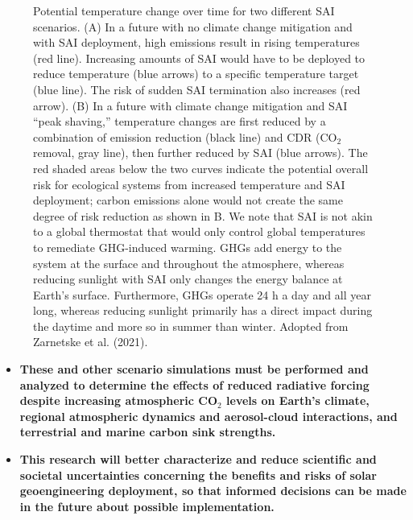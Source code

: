\begin{figure}
	\caption{Potential temperature change over time for two different SAI scenarios. (A) In a future with no climate change mitigation and with SAI deployment, high emissions result in rising temperatures (red line). Increasing amounts of SAI would have to be deployed to reduce temperature (blue arrows) to a specific temperature target (blue line). The risk of sudden SAI termination also increases (red arrow). (B) In a future with climate change mitigation and SAI ``peak shaving,'' temperature changes are first reduced by a combination of emission reduction (black line) and CDR (CO$_2$ removal, gray line), then further reduced by SAI (blue arrows). The red shaded areas below the two curves indicate the potential overall risk for ecological systems from increased temperature and SAI deployment; carbon emissions alone would not create the same degree of risk reduction as shown in B. We note that SAI is not akin to a global thermostat that would only control global temperatures to remediate GHG-induced warming. GHGs add energy to the system at the surface and throughout the atmosphere, whereas reducing sunlight with SAI only changes the energy balance at Earth's surface. Furthermore, GHGs operate 24 h a day and all year long, whereas reducing sunlight primarily has a direct impact during the daytime and more so in summer than winter. Adopted from Zarnetske et al. (2021).
	}\label{fig:peak_shaving}
\end{figure}

\begin{itemize}
	\item \textbf{These and other scenario simulations must be performed and analyzed to determine the effects of reduced radiative forcing despite increasing atmospheric CO$_2$ levels on Earth's climate, regional atmospheric dynamics and aerosol-cloud interactions, and terrestrial and marine carbon sink strengths.}

	\item \textbf{This research will better characterize and reduce scientific and societal uncertainties concerning the benefits and risks of solar geoengineering deployment, so that informed decisions can be made in the future about possible implementation.}

\end{itemize}


